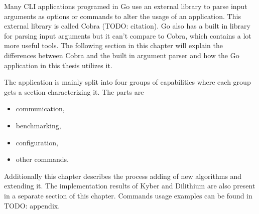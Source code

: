 Many CLI applications programed in Go use an external library to parse input arguments as options or commands to alter the usage of an application. This external library is called Cobra (TODO: citation). Go also has a built in library for parsing input arguments but it can't compare to Cobra, which contains a lot more useful tools. The following section in this chapter will explain the differences between Cobra and the built in argument parser and how the Go application in this thesis utilizes it.

The application is mainly split into four groups of capabilities where each group gets a section characterizing it. The parts are
\begin{itemize}
  \item communication,
  \item benchmarking,
  \item configuration,
  \item other commands.
\end{itemize}
\noindent Additionally this chapter describes the process adding of new algorithms and extending it. The implementation results of Kyber and Dilithium are also present in a separate section of this chapter. Commands usage examples can be found in TODO: appendix.
